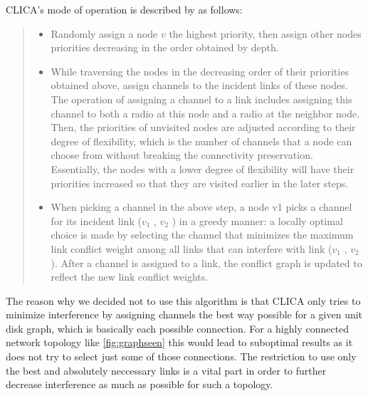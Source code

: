   CLICA's mode of operation is described by \cite{overview_caa} as follows:
  \begin{quote}
    \begin{itemize}
      \item Randomly assign a node \(v\) the highest priority, then assign other
	nodes priorities decreasing in the order obtained by depth.
      \item While traversing the nodes in the decreasing order of their
	priorities obtained above, assign channels to the incident links
	of these nodes. The operation of assigning a channel to a link
	includes assigning this channel to both a radio at this node and
	a radio at the neighbor node. Then, the priorities of unvisited
	nodes are adjusted according to their degree of flexibility, which
	is the number of channels that a node can choose from without
	breaking the connectivity preservation. Essentially, the nodes
	with a lower degree of flexibility will have their priorities
	increased so that they are visited earlier in the later steps.
      \item When picking a channel in the above step, a node v1 picks
	a channel for its incident link (\(v_1\) , \(v_2\) ) in a greedy manner: a
	locally optimal choice is made by selecting the channel that
	minimizes the maximum link conflict weight among all links
	that can interfere with link (\(v_1\) , \(v_2\) ). After a channel is assigned
	to a link, the conflict graph is updated to reflect the new link conflict weights.
    \end{itemize}
  \end{quote}
  
  The reason why we decided not to use this algorithm is that \ac{CLICA} only tries to minimize interference by assigning channels the best way possible for a given
  unit disk graph, which is basically each possible connection. For a highly connected network topology like \ref{fig:graphseen} this would lead to suboptimal results
  as it does not try to select just some of those connections. The restriction to use only the best and absolutely neccessary links is a vital part in order to 
  further decrease interference as much as possible for such a topology.

